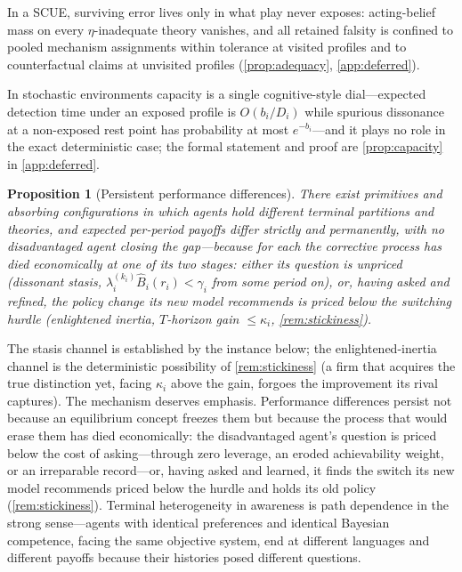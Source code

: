 \documentclass[11pt]{article}
\newtheorem{proposition}[assumption]{Proposition}
\theoremstyle{definition}
\begin{document}
In a SCUE, surviving error lives only in what play never exposes: acting-belief mass on every $\eta$-inadequate theory vanishes, and all retained falsity is confined to pooled mechanism assignments within tolerance at visited profiles and to counterfactual claims at unvisited profiles (\cref{prop:adequacy}, \cref{app:deferred}).

In stochastic environments capacity is a single cognitive-style dial---expected detection time under an exposed profile is $O(b_i/D_i)$ while spurious dissonance at a non-exposed rest point has probability at most $e^{-b_i}$---and it plays no role in the exact deterministic case; the formal statement and proof are \cref{prop:capacity} in \cref{app:deferred}.

\begin{proposition}[Persistent performance differences]
\label{prop:persistence}
There exist primitives and absorbing configurations in which agents hold different terminal partitions and theories, and expected per-period payoffs differ strictly and permanently, with no disadvantaged agent closing the gap---because for each the corrective process has died economically at one of its two stages: either its question is unpriced (\emph{dissonant stasis}, $\lambda_i^{(k_i)}\widehat B_i(r_i)<\gamma_i$ from some period on), or, having asked and refined, the policy change its new model recommends is priced below the switching hurdle (\emph{enlightened inertia}, $T$-horizon gain $\le\kappa_i$, \cref{rem:stickiness}).
\end{proposition}

The stasis channel is established by the instance below; the enlightened-inertia channel is the deterministic possibility of \cref{rem:stickiness} (a firm that acquires the true distinction yet, facing $\kappa_i$ above the gain, forgoes the improvement its rival captures). The mechanism deserves emphasis.
Performance differences persist not because an equilibrium concept freezes them but because the process that would erase them has died economically: the disadvantaged agent's question is priced below the cost of asking---through zero leverage, an eroded achievability weight, or an irreparable record---or, having asked and learned, it finds the switch its new model recommends priced below the hurdle and holds its old policy (\cref{rem:stickiness}).
Terminal heterogeneity in awareness is path dependence in the strong sense---agents with identical preferences and identical Bayesian competence, facing the same objective system, end at different languages and different payoffs because their histories posed different questions.
\end{document}
